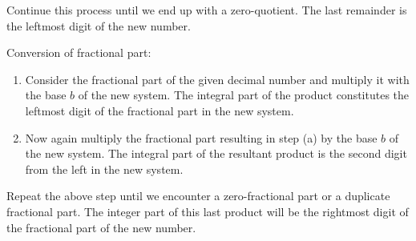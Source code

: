 	Continue this process until we end up with a zero-quotient. The last remainder is the leftmost digit of the new number.
	
	Conversion of fractional part:
	\begin{enumerate}
		\item Consider the fractional part of the given decimal number and multiply it with the base $b$ of the new system. The integral part of the product constitutes the leftmost digit of the fractional part in the new system.

		\item Now again multiply the fractional part resulting in step (a) by the base $b$ of the new system. The integral part of the resultant product is the second digit from the left in the new system.
	\end{enumerate} 
	
	Repeat the above step until we encounter a zero-fractional part or a duplicate fractional part. The integer part of this last product will be the rightmost digit of the fractional part of the new number.
	
